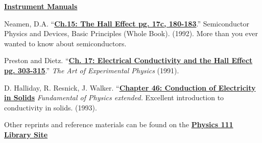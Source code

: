 \documentclass{../lab}
\newcommand{\InstrumentManuals}{http://experimentationlab.berkeley.edu/node/106}
\newcommand{\ChFifteenTheHallEffect}{http://physics111.lib.berkeley.edu/Physics111/Reprints/SHE/09-Semiconductors.pdf}
\newcommand{\ChSeventeenElectricalConductivityandtheHallEffect}{http://physics111.lib.berkeley.edu/Physics111/Reprints/SHE/07-Electrical_Conductivity.pdf}
\newcommand{\ChapterFortySixConductionofElectricity}{http://physics111.lib.berkeley.edu/Physics111/Reprints/SHE/Halliday_Resnick/Ch.\%2046\%20Conduction\%20of\%20electricity\%20in\%20solids.pdf}
\begin{document}
\begin{thebibliography}{}
\label{references}
\href{\InstrumentManuals}{\textbf{Instrument Manuals}}

Neamen, D.A. ``\href{\ChFifteenTheHallEffect}{\textbf{Ch.15: The Hall Effect pg. 17c, 180-183}}.'' Semiconductor Physics and Devices, Basic Principles (Whole Book). (1992). More than you ever wanted to know about semiconductors.

Preston and Dietz. ``\href{\ChSeventeenElectricalConductivityandtheHallEffect}{\textbf{Ch. 17: Electrical Conductivity and the Hall Effect pg. 303-315}}.'' \emph{The Art of Experimental Physics} (1991).

D. Halliday, R. Resnick, J. Walker. ``\href{\ChapterFortySixConductionofElectricity}{\textbf{Chapter 46: Conduction of Electricity in Solids}} \emph{Fundamental of Physics extended.} Excellent introduction to conductivity in solids. (1993).
\end{thebibliography}

\vspace{1em}
\noindent Other reprints and reference materials can be found on the \href{\LabReprints}{\textbf{Physics 111 Library Site}}
\end{document}
